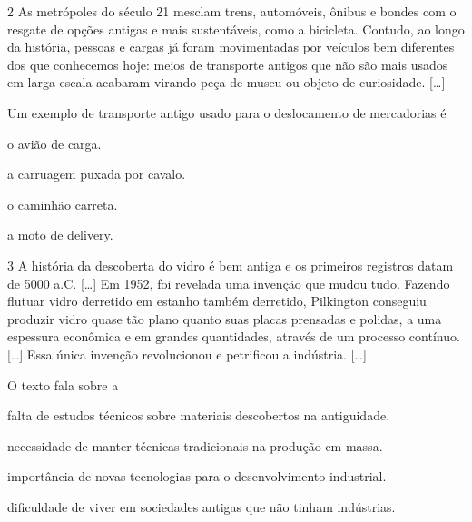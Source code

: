 \num{2} As metrópoles do século 21 mesclam trens, automóveis, ônibus e bondes
com o resgate de opções antigas e mais sustentáveis, como a bicicleta.
Contudo, ao longo da história, pessoas e cargas já foram movimentadas
por veículos bem diferentes dos que conhecemos hoje: meios de transporte
antigos que não são mais usados em larga escala acabaram virando peça de
museu ou objeto de curiosidade. {[}\ldots{}{]}


\pagebreak
Um exemplo de transporte antigo usado para o deslocamento de mercadorias é

\begin{minipage}{0.5\textwidth}
\begin{escolha}
\item o avião de carga.

\item a carruagem puxada por cavalo.

\item o caminhão carreta.

\item a moto de delivery.
\end{escolha}
\end{minipage}


\num{3} A história da descoberta do vidro é bem antiga e os primeiros
registros datam de 5000 a.C. {[}\ldots{}{]} Em 1952, foi revelada uma invenção que
mudou tudo. Fazendo flutuar vidro derretido em estanho também derretido,
Pilkington conseguiu produzir vidro quase tão plano quanto suas placas
prensadas e polidas, a uma espessura econômica e em grandes quantidades,
através de um processo contínuo. {[}\ldots{}{]} Essa única invenção revolucionou e
petrificou a indústria. {[}\ldots{}{]}


O texto fala sobre a

\begin{escolha}
\item falta de estudos técnicos sobre materiais descobertos na antiguidade.

\item necessidade de manter técnicas tradicionais na produção em massa.

\item importância de novas tecnologias para o desenvolvimento industrial.

\item dificuldade de viver em sociedades antigas que não tinham indústrias.
\end{escolha}




